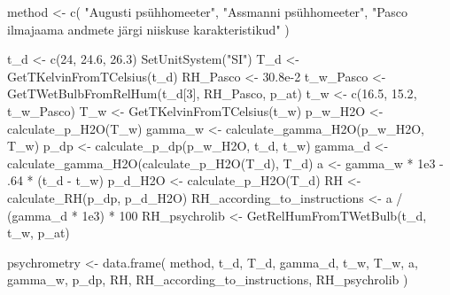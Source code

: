 \documentclass[
  12pt,
  a4paper,
  onecolumn, twoside]{article}
\newenvironment{Shaded}{\begin{snugshade}}{\end{snugshade}}
\newcommand{\DecValTok}[1]{\textcolor[rgb]{0.00,0.00,0.81}{#1}}
\newcommand{\FloatTok}[1]{\textcolor[rgb]{0.00,0.00,0.81}{#1}}
\newcommand{\FunctionTok}[1]{\textcolor[rgb]{0.00,0.00,0.00}{#1}}
\newcommand{\NormalTok}[1]{#1}
\newcommand{\OtherTok}[1]{\textcolor[rgb]{0.56,0.35,0.01}{#1}}
\newcommand{\SpecialCharTok}[1]{\textcolor[rgb]{0.00,0.00,0.00}{#1}}
\newcommand{\StringTok}[1]{\textcolor[rgb]{0.31,0.60,0.02}{#1}}
\begin{document}
\begin{Shaded}
\begin{Highlighting}[numbers=left,,]
\NormalTok{method }\OtherTok{\textless{}{-}} \FunctionTok{c}\NormalTok{(}
  \StringTok{"Augusti psühhomeeter"}\NormalTok{,}
  \StringTok{"Assmanni psühhomeeter"}\NormalTok{,}
  \StringTok{"Pasco}
\StringTok{ilmajaama}
\StringTok{andmete järgi}
\StringTok{niiskuse}
\StringTok{karakteristikud"}
\NormalTok{)}

\NormalTok{t\_d }\OtherTok{\textless{}{-}} \FunctionTok{c}\NormalTok{(}\DecValTok{24}\NormalTok{, }\FloatTok{24.6}\NormalTok{, }\FloatTok{26.3}\NormalTok{)}
\FunctionTok{SetUnitSystem}\NormalTok{(}\StringTok{"SI"}\NormalTok{)}
\NormalTok{T\_d }\OtherTok{\textless{}{-}} \FunctionTok{GetTKelvinFromTCelsius}\NormalTok{(t\_d)}
\NormalTok{RH\_Pasco }\OtherTok{\textless{}{-}} \FloatTok{30.8e{-}2}
\NormalTok{t\_w\_Pasco }\OtherTok{\textless{}{-}} \FunctionTok{GetTWetBulbFromRelHum}\NormalTok{(t\_d[}\DecValTok{3}\NormalTok{], RH\_Pasco, p\_at)}
\NormalTok{t\_w }\OtherTok{\textless{}{-}} \FunctionTok{c}\NormalTok{(}\FloatTok{16.5}\NormalTok{, }\FloatTok{15.2}\NormalTok{, t\_w\_Pasco)}
\NormalTok{T\_w }\OtherTok{\textless{}{-}} \FunctionTok{GetTKelvinFromTCelsius}\NormalTok{(t\_w)}
\NormalTok{p\_w\_H2O }\OtherTok{\textless{}{-}} \FunctionTok{calculate\_p\_H2O}\NormalTok{(T\_w)}
\NormalTok{gamma\_w }\OtherTok{\textless{}{-}} \FunctionTok{calculate\_gamma\_H2O}\NormalTok{(p\_w\_H2O, T\_w)}
\NormalTok{p\_dp }\OtherTok{\textless{}{-}} \FunctionTok{calculate\_p\_dp}\NormalTok{(p\_w\_H2O, t\_d, t\_w)}
\NormalTok{gamma\_d }\OtherTok{\textless{}{-}} \FunctionTok{calculate\_gamma\_H2O}\NormalTok{(}\FunctionTok{calculate\_p\_H2O}\NormalTok{(T\_d), T\_d)}
\NormalTok{a }\OtherTok{\textless{}{-}}\NormalTok{ gamma\_w }\SpecialCharTok{*} \FloatTok{1e3} \SpecialCharTok{{-}}\NormalTok{ .}\DecValTok{64} \SpecialCharTok{*}\NormalTok{ (t\_d }\SpecialCharTok{{-}}\NormalTok{ t\_w)}
\NormalTok{p\_d\_H2O }\OtherTok{\textless{}{-}} \FunctionTok{calculate\_p\_H2O}\NormalTok{(T\_d)}
\NormalTok{RH }\OtherTok{\textless{}{-}} \FunctionTok{calculate\_RH}\NormalTok{(p\_dp, p\_d\_H2O)}
\NormalTok{RH\_according\_to\_instructions }\OtherTok{\textless{}{-}}\NormalTok{ a }\SpecialCharTok{/}\NormalTok{ (gamma\_d }\SpecialCharTok{*} \FloatTok{1e3}\NormalTok{) }\SpecialCharTok{*} \DecValTok{100}
\NormalTok{RH\_psychrolib }\OtherTok{\textless{}{-}} \FunctionTok{GetRelHumFromTWetBulb}\NormalTok{(t\_d, t\_w, p\_at)}

\NormalTok{psychrometry }\OtherTok{\textless{}{-}} \FunctionTok{data.frame}\NormalTok{(}
\NormalTok{  method,}
\NormalTok{  t\_d,}
\NormalTok{  T\_d,}
\NormalTok{  gamma\_d,}
\NormalTok{  t\_w,}
\NormalTok{  T\_w,}
\NormalTok{  a,}
\NormalTok{  gamma\_w,}
\NormalTok{  p\_dp,}
\NormalTok{  RH,}
\NormalTok{  RH\_according\_to\_instructions,}
\NormalTok{  RH\_psychrolib}
\NormalTok{)}


\end{Highlighting}
\end{Shaded}
\end{document}
